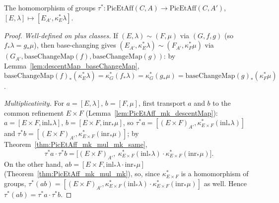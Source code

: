 \begin{definition}
  \label{def:PicEtAff_map}
  \leanok
  The homomorphism of groups \(\tau^{*} \colon \mathrm{PicEtAff}(C,A) \to
  \mathrm{PicEtAff}(C,A')\), \([E,\lambda] \mapsto [E_{A'}, \kappa_E^{*}\lambda]\).
\end{definition}
\begin{proof}
  \leanok
  \emph{Well-defined on plus classes.} If \((E,\lambda) \sim (F,\mu)\) via \((G,f,g)\)
  (so \(f_{*}\lambda = g_{*}\mu\)), then base-changing gives \((E_{A'},\kappa_E^{*}\lambda) \sim
  (F_{A'},\kappa_F^{*}\mu)\) via \((G_{A'}, \mathrm{baseChangeMap}(f),
  \mathrm{baseChangeMap}(g))\): by Lemma~\ref{lem:descentMap_baseChangeMap},
  \(\mathrm{baseChangeMap}(f)_{*}(\kappa_E^{*}\lambda) = \kappa_G^{*}(f_{*}\lambda) =
  \kappa_G^{*}(g_{*}\mu) = \mathrm{baseChangeMap}(g)_{*}(\kappa_F^{*}\mu)\).

  \emph{Multiplicativity.} For \(a = [E,\lambda]\), \(b = [F,\mu]\), first transport \(a\) and
  \(b\) to the common refinement \(E \times F\) (Lemma~\ref{lem:PicEtAff_mk_descentMap}):
  \(a = [E \times F, \mathrm{inl}_{*}\lambda]\), \(b = [E \times F, \mathrm{inr}_{*}\mu]\), so
  \(\tau^{*}a = [(E \times F)_{A'}, \kappa_{E \times F}^{*}(\mathrm{inl}_{*}\lambda)]\) and
  \(\tau^{*}b = [(E \times F)_{A'}, \kappa_{E \times F}^{*}(\mathrm{inr}_{*}\mu)]\); by
  Theorem~\ref{thm:PicEtAff_mk_mul_mk_same},
  \[
    \tau^{*}a \cdot \tau^{*}b = \bigl[(E \times F)_{A'},\ \kappa_{E \times F}^{*}
    (\mathrm{inl}_{*}\lambda) \cdot \kappa_{E \times F}^{*}(\mathrm{inr}_{*}\mu)\bigr].
  \]
  On the other hand, \(ab = [E \times F, \mathrm{inl}_{*}\lambda \cdot \mathrm{inr}_{*}\mu]\)
  (Theorem~\ref{thm:PicEtAff_mk_mul_mk}), so, since \(\kappa_{E \times F}^{*}\) is a
  homomorphism of groups, \(\tau^{*}(ab) = [(E \times F)_{A'}, \kappa_{E \times F}^{*}
  (\mathrm{inl}_{*}\lambda) \cdot \kappa_{E \times F}^{*}(\mathrm{inr}_{*}\mu)]\) as well. Hence
  \(\tau^{*}(ab) = \tau^{*}a \cdot \tau^{*}b\).
\end{proof}

